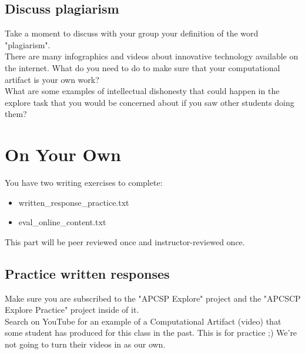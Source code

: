 \documentclass{42-en}
\begin{document}
\section{Discuss plagiarism}

Take a moment to discuss with your group your definition of the word "plagiarism". \\

There are many infographics and videos about innovative technology available on the internet. What do you need to do to make sure that your computational artifact is your own work?\\

What are some examples of intellectual dishonesty that could happen in the explore task that you would be concerned about if you saw other students doing them?\\



\chapter{On Your Own}

You have two writing exercises to complete:
\begin{itemize}
	\item written\_response\_practice.txt
	\item eval\_online\_content.txt
\end{itemize}

This part will be peer reviewed once and instructor-reviewed once. 

\section{Practice written responses}

Make sure you are subscribed to the "APCSP \- Explore" project and the "APCSCP \- Explore Practice" project inside of it.\\

Search on YouTube for an example of a Computational Artifact (video) that some student has produced for this class in the past. This is for practice ;) We're not going to turn their videos in as our own.\\
\end{document}
